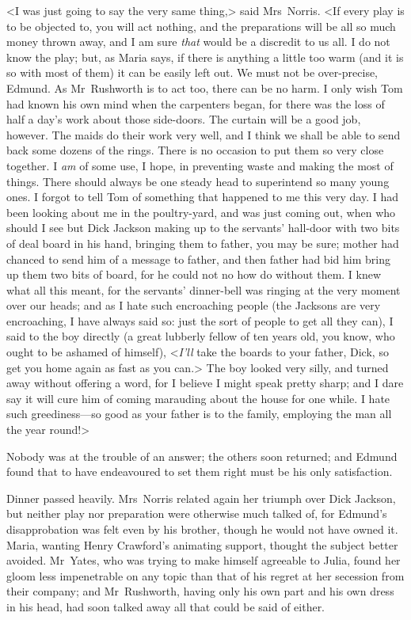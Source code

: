 <I was just going to say the very same thing,> said Mrs~Norris. <If every play is to be objected to, you will act nothing, and the preparations will be all so much money thrown away, and I am sure \textit{that}  would be a discredit to us all. I do not know the play; but, as Maria says, if there is anything a little too warm (and it is so with most of them) it can be easily left out. We must not be over-precise, Edmund. As Mr~Rushworth is to act too, there can be no harm. I only wish Tom had known his own mind when the carpenters began, for there was the loss of half a day's work about those side-doors. The curtain will be a good job, however. The maids do their work very well, and I think we shall be able to send back some dozens of the rings. There is no occasion to put them so very close together. I \textit{am}  of some use, I hope, in preventing waste and making the most of things. There should always be one steady head to superintend so many young ones. I forgot to tell Tom of something that happened to me this very day. I had been looking about me in the poultry-yard, and was just coming out, when who should I see but Dick Jackson making up to the servants' hall-door with two bits of deal board in his hand, bringing them to father, you may be sure; mother had chanced to send him of a message to father, and then father had bid him bring up them two bits of board, for he could not no how do without them. I knew what all this meant, for the servants' dinner-bell was ringing at the very moment over our heads; and as I hate such encroaching people (the Jacksons are very encroaching, I have always said so: just the sort of people to get all they can), I said to the boy directly (a great lubberly fellow of ten years old, you know, who ought to be ashamed of himself), <\textit{I'll}  take the boards to your father, Dick, so get you home again as fast as you can.> The boy looked very silly, and turned away without offering a word, for I believe I might speak pretty sharp; and I dare say it will cure him of coming marauding about the house for one while. I hate such greediness—so good as your father is to the family, employing the man all the year round!>

Nobody was at the trouble of an answer; the others soon returned; and Edmund found that to have endeavoured to set them right must be his only satisfaction.

Dinner passed heavily. Mrs~Norris related again her triumph over Dick Jackson, but neither play nor preparation were otherwise much talked of, for Edmund's disapprobation was felt even by his brother, though he would not have owned it. Maria, wanting Henry Crawford's animating support, thought the subject better avoided. Mr~Yates, who was trying to make himself agreeable to Julia, found her gloom less impenetrable on any topic than that of his regret at her secession from their company; and Mr~Rushworth, having only his own part and his own dress in his head, had soon talked away all that could be said of either.

